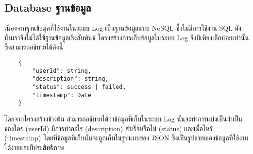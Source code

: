 \subsection{\ifenglish Database \else ฐานข้อมูล \fi}

\ifenglish
\else
เนื่องจากฐานข้อมูลที่ใช้งานในระบบ Log เป็นฐานข้อมูลแบบ NoSQL ซึ่งไม่มีการใช้งาน SQL ดังนั้นเราจึงไม่ได้ใช้ฐานข้อมูลเชิงสัมพันธ์ โครงสร้างการเก็บข้อมูลในระบบ Log จึงมีเพียงเล็กน้อยเท่านั้น ซึ่งสามารถอธิบายได้ดังนี้

\begin{lstlisting}
    {
        "userId": string,
        "description": string,
        "status": success | failed,
        "timestamp": Date
    }
\end{lstlisting}

โดยจากโครงสร้างข้างต้น สามารถอธิบายได้ว่าข้อมูลที่เก็บในระบบ Log นั้นจะทำการแบ่งเป็นว่าเป็นของใคร (userId) มีการทำอะไร (description) สำเร็จหรือไม่ (status) และเมื่อไหร่ (timestamp) โดยที่ข้อมูลที่เก็บนั้นจะถูกเก็บในรูปแบบของ JSON ซึ่งเป็นรูปแบบของข้อมูลที่ใช้งานได้ง่ายและมีประสิทธิภาพ
\fi
